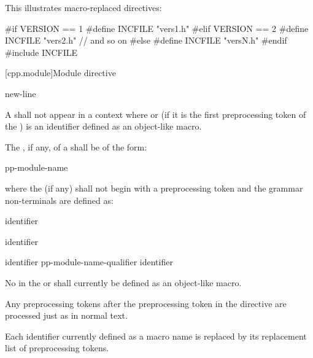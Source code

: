 \pnum
\begin{example}
This illustrates macro-replaced
directives:

\begin{codeblock}
#if VERSION == 1
    #define INCFILE  "vers1.h"
#elif VERSION == 2
    #define INCFILE  "vers2.h"  // and so on
#else
    #define INCFILE  "versN.h"
#endif
#include INCFILE
\end{codeblock}
\end{example}

[cpp.module]{Module directive}
%

\begin{bnf}
\br
       \terminal{;} new-line
\end{bnf}

\pnum
A  shall not
appear in a context where 
or (if it is the first preprocessing token of the ) 
is an identifier defined as an object-like macro.

\pnum
The , if any, of a 
shall be of the form:
\begin{ncsimplebnf}
pp-module-name  
\end{ncsimplebnf}
where the  (if any) shall not begin with
a \tcode{(} preprocessing token and
the grammar non-terminals are defined as:
\begin{ncbnf}
\br
     identifier
\end{ncbnf}
\begin{ncbnf}
\br
    \terminal{:}  identifier
\end{ncbnf}
\begin{ncbnf}
\br
    identifier \br
    pp-module-name-qualifier identifier 
\end{ncbnf}
No  in
the  or 
shall currently be defined as an object-like macro.

\pnum
Any preprocessing tokens after the  preprocessing token
in the  directive are processed just as in normal text.
\begin{note}
Each identifier currently defined as a macro name
is replaced by its replacement list of preprocessing tokens.
\end{note}


